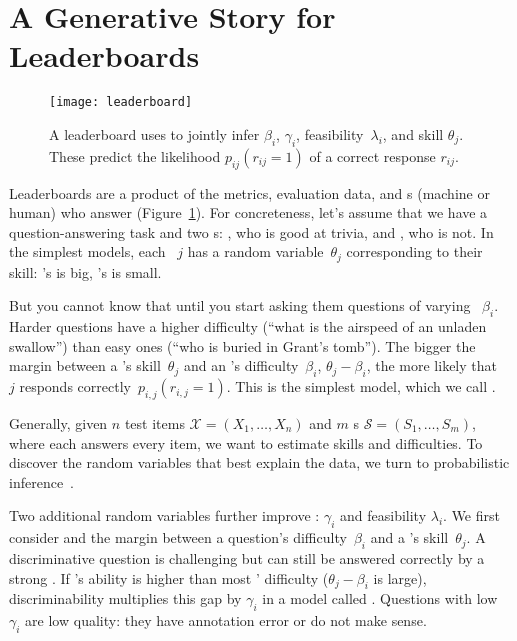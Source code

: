 \section{A Generative Story for Leaderboards}
\label{ch:isicle:lead}

\begin{figure}[t]
  \centering
  \texttt{[image: leaderboard]}
  \caption{
    A \name{} leaderboard uses \irt{} to jointly infer \itm{} \diff{} $\beta_i$, \discability{} $\gamma_i$, feasibility~$\lambda_i$, and \subj{} skill $\theta_j$.
    These predict the likelihood $p_{ij}(r_{ij}=1)$ of a correct response $r_{ij}$.
  }
  \label{fig:story}
\end{figure}

Leaderboards are a product of the metrics, evaluation data, and
\subj{}s (machine or human) who answer \itms{}
(Figure~\ref{fig:story}).
%
For concreteness, let's assume that we have a question-answering task and two \subj{}s: \smart{},
who is good at trivia, and \dumb{}, who is not.
%
In the simplest \irt{} models, each \subj{}~$j$ has a random
variable~$\theta_j$ corresponding to their skill: \smart{}'s is big,
\dumb{}'s is small.

But you cannot know that until you start asking them questions of
varying ~$\beta_i$.
%
Harder questions have a higher difficulty (``what is the airspeed of
an unladen swallow'') than easy ones (``who is buried in Grant's
tomb'').
%
The bigger the margin between a \subj{}'s skill~$\theta_j$ and an \itm{}'s
difficulty~$\beta_i$, $\theta_j-\beta_i$, the more likely that \subj{}~$j$
responds correctly~$p_{i,j}(r_{i,j}=1)$.
%
This is the simplest  model, which we call {\bf {}}.

Generally, given $n$ test items $\mathcal{X}=(X_1,\ldots,X_n)$
and $m$ \subj{}s
$\mathcal{S}=(S_1,\ldots,S_m)$, where each \subj{} answers every
item, we want to estimate \subj{} skills and \itm{} difficulties.
%
To discover the random variables that best explain the data, we
turn to probabilistic inference~\cite{pearl-88}.


Two additional random variables further improve \name{}:
\discability{} $\gamma_i$ and feasibility $\lambda_i$.
%
We first consider \discability{} and the margin between a
question's difficulty~$\beta_i$ and a \subj{}'s skill~$\theta_j$.
%
A discriminative question is challenging but can still be answered
correctly by a strong \subj{}.
%
If \smart{}'s ability is higher than most \itms{}' difficulty
($\theta_j-\beta_i$ is large), \itm{} discriminability multiplies this
gap by $\gamma_i$ in a model called {\bf {}}.
%
Questions with low $\gamma_i$ are low quality: they have annotation
error or do not make sense.

